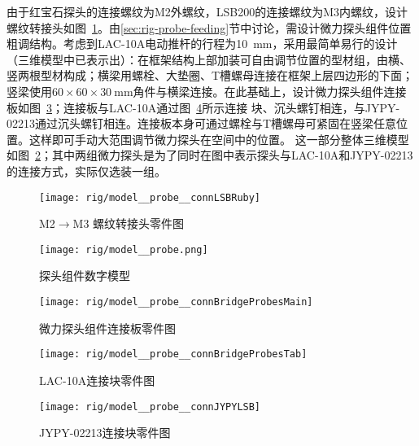 由于红宝石探头的连接螺纹为M2外螺纹，LSB200的连接螺纹为M3内螺纹，设计螺纹转接头如图~\ref{fig:rig-model-probe-connLSBRuby}。由\ref{sec:rig-probe-feeding}节中讨论，需设计微力探头组件位置粗调结构。考虑到LAC-10A电动推杆的行程为\SI{10}{\milli\meter}，采用最简单易行的设计（三维模型中已表示出）：在框架结构上部加装可自由调节位置的型材组，由横、竖两根型材构成；横梁用螺栓、大垫圈、T槽螺母连接在框架上层四边形的下面；竖梁使用$\num{60}\times\num{60}\times\SI{30}{\milli\meter}$角件与横梁连接。在此基础上，设计微力探头组件连接板如图~\ref{fig:rig-model-probe-connBridgeProbesMain}；连接板与LAC-10A通过图~\ref{fig:rig-model-probe-connBridgeProbesTab}所示连接 块、沉头螺钉相连，与JYPY-02213通过沉头螺钉相连。连接板本身可通过螺栓与T槽螺母可紧固在竖梁任意位置。这样即可手动大范围调节微力探头在空间中的位置。
这一部分整体三维模型如图~\ref{fig:rig-model-probe}；其中两组微力探头是为了同时在图中表示探头与LAC-10A和JYPY-02213的连接方式，实际仅选装一组。


\begin{figure}[tbh]
\centering
\texttt{[image: rig/model\_\_probe\_\_connLSBRuby]}
\caption{M2$\to$M3 螺纹转接头零件图}
\label{fig:rig-model-probe-connLSBRuby}
\end{figure}

\begin{figure}[tbh]
\centering
\texttt{[image: rig/model\_\_probe.png]}
\caption{探头组件数字模型}
\label{fig:rig-model-probe}
\end{figure}

\begin{figure}[p]
\centering
\texttt{[image: rig/model\_\_probe\_\_connBridgeProbesMain]}
\caption{微力探头组件连接板零件图}
\label{fig:rig-model-probe-connBridgeProbesMain}
\end{figure}

\begin{figure}[p]
\centering
\texttt{[image: rig/model\_\_probe\_\_connBridgeProbesTab]}
\caption{LAC-10A连接块零件图}
\label{fig:rig-model-probe-connBridgeProbesTab}
\end{figure}

\begin{figure}[p]
\centering
\texttt{[image: rig/model\_\_probe\_\_connJYPYLSB]}
\caption{JYPY-02213连接块零件图}
\label{fig:rig-model-probe-connJYPYLSB}
\end{figure}





